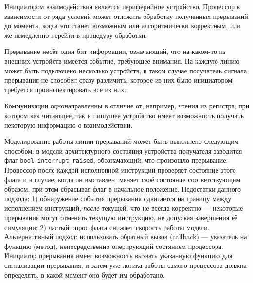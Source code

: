 \begin{itemize*}
\item Инициатором взаимодействия является периферийное  уст\-ройст\-во. Процессор в зависимости от ряда условий может отложить обработку полученных прерываний до момента, когда это станет возможным или алгоритмически корректным, или же немедленно перейти в процедуру обработки.

\item Прерывание несёт один бит информации, означающий, что на каком-то из внешних устройств имеется событие, требующее внимания. На каждую линию может быть подключено несколько устройств; в таком случае получатель сигнала прерывания не способен сразу различить, которое из них было инициатором --- требуется проинспектировать все из них.

\item Коммуникации однонаправленны в отличие от, например, чтения из регистра, при котором как читающее, так и пишушее устройство имеет возможность получить некоторую информацию о взаимодействии.
\end{itemize*}



Моделирование работы линии прерываний может быть выполнено следующим способом: в модели архитектурного состояния устройства-получателя заводится флаг \texttt{bool interrupt_raised}, обозначающий, что произошло прерывание. Процессор после каждой исполненной инструкции проверяет состояние этого флага и в случае, когда он выставлен, меняет своё состояние соответствующим образом, при этом сбрасывая флаг в начальное положение. Недостатки данного подхода: 1) обнаружение события прерывания сдвигается на границу между исполнением инструкций, \emph{после} текущей, что не всегда корректно --- некоторые прерывания могут отменять текущую инструкцию, не допуская завершения её симуляции; 2) частый опрос флага снижает скорость работы модели. Альтернативный подход: использовать обратный вызов (\abbr callback) --- указатель на функцию (метод), непосредственно оперирующий состянием процессора. Инициатор прерывания имеет возможность вызвать указанную функцию для сигнализации прерывания, и затем уже логика работы самого процессора должна определять, в какой момент оно будет им обработано.

